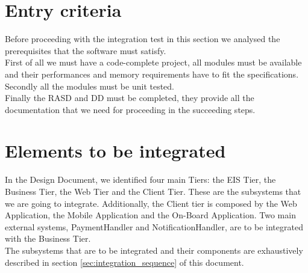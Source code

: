 \section{Entry criteria}
Before proceeding with the integration test in this section we analysed the prerequisites that the software must satisfy.
\\First of all we must have a code-complete project, all modules must be available and their performances and memory requirements have to fit the specifications.
\\Secondly all the modules must be unit tested. 
\\Finally the RASD and DD must be completed, they provide all the documentation that we need for proceeding in the succeeding steps.

\section{Elements to be integrated}
In the Design Document, we identified four main Tiers: the EIS Tier, the Business Tier, the Web Tier and the Client Tier. These are the subsystems that we are going to integrate.
Additionally, the Client tier is composed by the Web Application, the Mobile Application and the On-Board Application. Two main external systems, PaymentHandler and NotificationHandler, are to be integrated with the Business Tier.
\\The subsystems that are to be integrated and their components are exhaustively described in section \ref{sec:integration_sequence} of this document.

